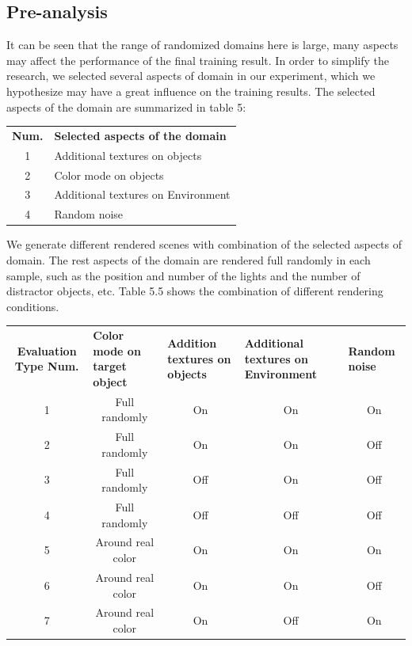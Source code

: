 \subsection{Pre-analysis}
It can be seen that the range of randomized domains here is large, many aspects may affect the performance of the final training result. In order to simplify the research, we selected several aspects of domain in our experiment, which we hypothesize may have a great influence on the training results. The selected aspects of the domain are summarized in table 5:

\begin{table}[h]
	\begin{tabular}{cl}
		\textbf{Num.} & \textbf{Selected aspects of the domain} \\
		1             & Additional textures on objects          \\
		2             & Color mode on objects                   \\
		3             & Additional textures on Environment      \\
		4             & Random noise                           
	\end{tabular}
\end{table}

We generate different rendered scenes with combination of the selected aspects of domain. The rest aspects of the domain are rendered full randomly in each sample, such as the position and number of the lights and the number of distractor objects, etc. Table 5.5 shows the combination of different rendering conditions.
\begin{table}[]
	\begin{tabular}{ccccc}
		\textbf{Evaluation Type Num.} & \multicolumn{1}{l}{\textbf{Color mode on target object}} & \multicolumn{1}{l}{\textbf{Addition textures on objects}} & \multicolumn{1}{l}{\textbf{Additional textures on Environment}} & \multicolumn{1}{l}{\textbf{Random noise}} \\
		1 & Full randomly & On & On & On \\
		2 & Full randomly & On & On & Off \\
		3 & Full randomly & Off & On & Off \\
		4 & Full randomly & Off & Off & Off \\
		5 & Around real color & On & On & On \\
		6 & Around real color & On & On & Off \\
		7 & Around real color & On & Off & On
	\end{tabular}
\end{table}

